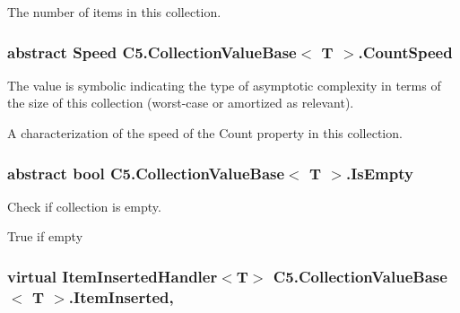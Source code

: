 The number of items in this collection. 

\hypertarget{class_c5_1_1_collection_value_base_a29cca9929ed4b155a56f6c7297208ef3}{}
\subsubsection[{Count\+Speed}]{\setlength{\rightskip}{0pt plus 5cm}abstract {\bf Speed} {\bf C5.\+Collection\+Value\+Base}$<$ T $>$.Count\+Speed\hspace{0.3cm}{\ttfamily [get]}}\label{class_c5_1_1_collection_value_base_a29cca9929ed4b155a56f6c7297208ef3}


The value is symbolic indicating the type of asymptotic complexity in terms of the size of this collection (worst-\/case or amortized as relevant). 

A characterization of the speed of the {\ttfamily Count} property in this collection.\hypertarget{class_c5_1_1_collection_value_base_a9b906017c85e357268f116b3ac05e665}{}
\subsubsection[{Is\+Empty}]{\setlength{\rightskip}{0pt plus 5cm}abstract bool {\bf C5.\+Collection\+Value\+Base}$<$ T $>$.Is\+Empty\hspace{0.3cm}{\ttfamily [get]}}\label{class_c5_1_1_collection_value_base_a9b906017c85e357268f116b3ac05e665}


Check if collection is empty. 

True if empty\hypertarget{class_c5_1_1_collection_value_base_acfa66e3ccad2023f13ce71b2114e7809}{}
\subsubsection[{Item\+Inserted}]{\setlength{\rightskip}{0pt plus 5cm}virtual Item\+Inserted\+Handler$<$T$>$ {\bf C5.\+Collection\+Value\+Base}$<$ T $>$.Item\+Inserted\hspace{0.3cm}{\ttfamily [add]}, {\ttfamily [remove]}}\label{class_c5_1_1_collection_value_base_acfa66e3ccad2023f13ce71b2114e7809}


